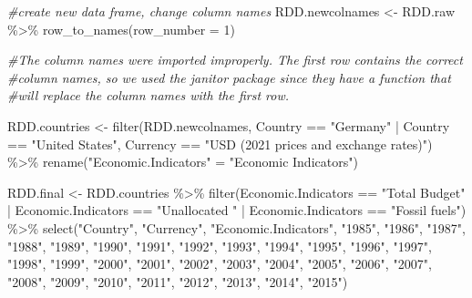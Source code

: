 \documentclass[
  12pt,
]{article}
\newenvironment{Shaded}{\begin{snugshade}}{\end{snugshade}}
\newcommand{\AttributeTok}[1]{\textcolor[rgb]{0.77,0.63,0.00}{#1}}
\newcommand{\CommentTok}[1]{\textcolor[rgb]{0.56,0.35,0.01}{\textit{#1}}}
\newcommand{\DecValTok}[1]{\textcolor[rgb]{0.00,0.00,0.81}{#1}}
\newcommand{\FunctionTok}[1]{\textcolor[rgb]{0.00,0.00,0.00}{#1}}
\newcommand{\NormalTok}[1]{#1}
\newcommand{\OtherTok}[1]{\textcolor[rgb]{0.56,0.35,0.01}{#1}}
\newcommand{\SpecialCharTok}[1]{\textcolor[rgb]{0.00,0.00,0.00}{#1}}
\newcommand{\StringTok}[1]{\textcolor[rgb]{0.31,0.60,0.02}{#1}}
\begin{document}
\begin{Shaded}
\begin{Highlighting}[]
\CommentTok{\#create new data frame, change column names}
\NormalTok{RDD.newcolnames }\OtherTok{\textless{}{-}}\NormalTok{ RDD.raw }\SpecialCharTok{\%\textgreater{}\%}
  \FunctionTok{row\_to\_names}\NormalTok{(}\AttributeTok{row\_number =} \DecValTok{1}\NormalTok{)}

\CommentTok{\#The column names were imported improperly. The first row contains the correct }
\CommentTok{\#column names, so we used the janitor package since they have a function that }
\CommentTok{\#will replace the column names with the first row.}


\NormalTok{RDD.countries }\OtherTok{\textless{}{-}}
  \FunctionTok{filter}\NormalTok{(RDD.newcolnames,}
\NormalTok{         Country }\SpecialCharTok{==} \StringTok{"Germany"} \SpecialCharTok{|}\NormalTok{ Country }\SpecialCharTok{==} \StringTok{"United States"}\NormalTok{,}
\NormalTok{         Currency }\SpecialCharTok{==} \StringTok{"USD (2021 prices and exchange rates)"}\NormalTok{) }\SpecialCharTok{\%\textgreater{}\%}
  \FunctionTok{rename}\NormalTok{(}\StringTok{"Economic.Indicators"} \OtherTok{=} \StringTok{"Economic Indicators"}\NormalTok{)}


\NormalTok{RDD.final }\OtherTok{\textless{}{-}}\NormalTok{ RDD.countries }\SpecialCharTok{\%\textgreater{}\%}
  \FunctionTok{filter}\NormalTok{(Economic.Indicators }\SpecialCharTok{==} \StringTok{"Total Budget"} \SpecialCharTok{|}\NormalTok{ Economic.Indicators }\SpecialCharTok{==} \StringTok{"Unallocated "} \SpecialCharTok{|}\NormalTok{ Economic.Indicators }\SpecialCharTok{==} \StringTok{"Fossil fuels"}\NormalTok{) }\SpecialCharTok{\%\textgreater{}\%}
  \FunctionTok{select}\NormalTok{(}\StringTok{"Country"}\NormalTok{, }\StringTok{"Currency"}\NormalTok{, }\StringTok{"Economic.Indicators"}\NormalTok{, }\StringTok{"1985"}\NormalTok{, }\StringTok{"1986"}\NormalTok{, }\StringTok{"1987"}\NormalTok{, }\StringTok{"1988"}\NormalTok{, }\StringTok{"1989"}\NormalTok{, }\StringTok{"1990"}\NormalTok{, }\StringTok{"1991"}\NormalTok{, }\StringTok{"1992"}\NormalTok{, }\StringTok{"1993"}\NormalTok{, }\StringTok{"1994"}\NormalTok{, }\StringTok{"1995"}\NormalTok{, }\StringTok{"1996"}\NormalTok{, }\StringTok{"1997"}\NormalTok{, }\StringTok{"1998"}\NormalTok{, }\StringTok{"1999"}\NormalTok{, }\StringTok{"2000"}\NormalTok{, }\StringTok{"2001"}\NormalTok{, }\StringTok{"2002"}\NormalTok{, }\StringTok{"2003"}\NormalTok{, }\StringTok{"2004"}\NormalTok{, }\StringTok{"2005"}\NormalTok{, }\StringTok{"2006"}\NormalTok{, }\StringTok{"2007"}\NormalTok{, }\StringTok{"2008"}\NormalTok{, }\StringTok{"2009"}\NormalTok{, }\StringTok{"2010"}\NormalTok{, }\StringTok{"2011"}\NormalTok{, }\StringTok{"2012"}\NormalTok{, }\StringTok{"2013"}\NormalTok{, }\StringTok{"2014"}\NormalTok{, }\StringTok{"2015"}\NormalTok{)}


\end{Highlighting}
\end{Shaded}
\end{document}
